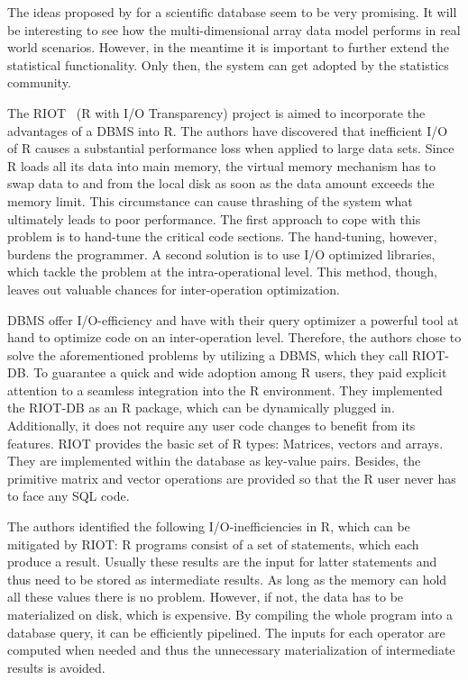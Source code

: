 The ideas proposed by \citeauthor{stonebraker:2009a} for a scientific database seem to be very promising.
It will be interesting to see how the multi-dimensional array data model performs in real world scenarios.
However, in the meantime it is important to further extend the statistical functionality.
Only then, the system can get adopted by the statistics community.

The RIOT~\cite{zhang:apa2009a} (R with I/O Transparency) project is aimed to incorporate the advantages of a DBMS into R.
The authors \citeauthor{zhang:apa2009a} have discovered that inefficient I/O of R causes a substantial performance loss when applied to large data sets.
Since R loads all its data into main memory, the virtual memory mechanism has to swap data to and from the local disk as soon as the data amount exceeds the memory limit.
This circumstance can cause thrashing of the system what ultimately leads to poor performance.
The first approach to cope with this problem is to hand-tune the critical code sections.
The hand-tuning, however, burdens the programmer.
A second solution is to use I/O optimized libraries, which tackle the problem at the intra-operational level.
This method, though, leaves out valuable chances for inter-operation optimization.

DBMS offer I/O-efficiency and have with their query optimizer a powerful tool at hand to optimize code on an inter-operation level.
Therefore, the authors chose to solve the aforementioned problems by utilizing a DBMS, which they call RIOT-DB.
To guarantee a quick and wide adoption among R users, they paid explicit attention to a seamless integration into the R environment.
They implemented the RIOT-DB as an R package, which can be dynamically plugged in.
Additionally, it does not require any user code changes to benefit from its features.
RIOT provides the basic set of R types: Matrices, vectors and arrays.
They are implemented within the database as key-value pairs.
Besides, the primitive matrix and vector operations are provided so that the R user never has to face any SQL code.

The authors identified the following I/O-inefficiencies in R, which can be mitigated by RIOT:
R programs consist of a set of statements, which each produce a result.
Usually these results are the input for latter statements and thus need to be stored as intermediate results.
As long as the memory can hold all these values there is no problem.
However, if not, the data has to be materialized on disk, which is expensive.
By compiling the whole program into a database query, it can be efficiently pipelined.
The inputs for each operator are computed when needed and thus the unnecessary materialization of intermediate results is avoided.

